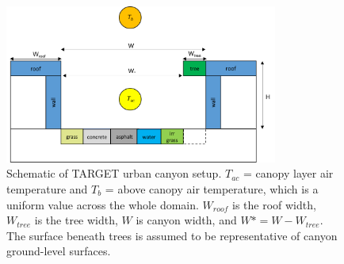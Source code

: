 \documentclass[gmd, manuscript]{copernicus}
\begin{document}
\begin{figure}[!htbp]
\begin{center}

\includegraphics[width=0.8\textwidth,keepaspectratio]{figure2.png}

\caption{Schematic of TARGET urban canyon setup. $T_{ac}$ = canopy layer air temperature and \ensuremath{T_{b}} = above canopy air temperature, which is a uniform value across the whole domain. $W_{roof}$ is the roof width, $W_{tree}$ is the tree width, $W$ is canyon width, and $W* = W - W_{tree}$. The surface beneath trees is assumed to be representative of  canyon ground-level surfaces. } \label{fig:canyon}
 \end{center}

\end{figure}
\end{document}
